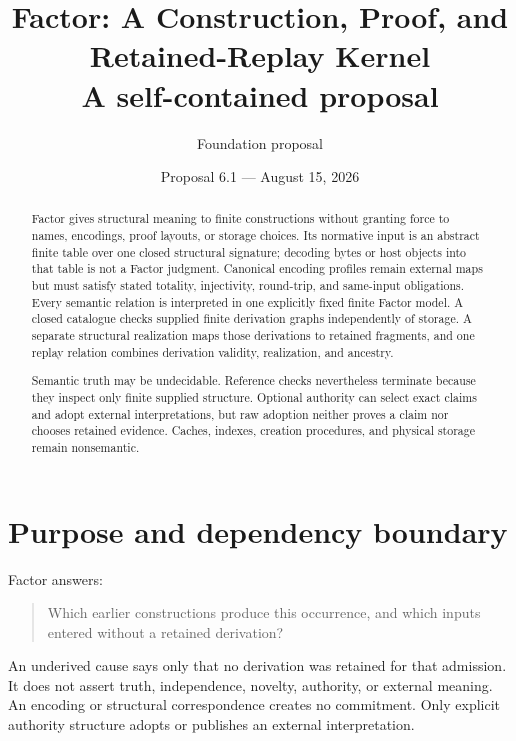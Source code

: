 \documentclass[11pt,twoside]{article}
\title{\textbf{Factor: A Construction, Proof, and Retained-Replay Kernel}\\[0.35em]
\large A self-contained proposal}
\author{Foundation proposal}
\date{Proposal 6.1 --- August 15, 2026}
\begin{document}
\maketitle
\thispagestyle{empty}

\begin{abstract}
Factor gives structural meaning to finite constructions without granting force to
names, encodings, proof layouts, or storage choices.  Its normative input is an
abstract finite table over one closed structural signature; decoding bytes or host
objects into that table is not a Factor judgment.  Canonical encoding profiles
remain external maps but must satisfy stated totality, injectivity, round-trip, and
same-input obligations.  Every semantic relation is interpreted in one explicitly
fixed finite Factor model.  A closed catalogue
checks supplied finite derivation graphs independently of storage.  A separate
structural realization maps those derivations to retained fragments, and one replay
relation combines derivation validity, realization, and ancestry.

Semantic truth may be undecidable.  Reference checks nevertheless terminate
because they inspect only finite supplied structure.  Optional authority can select
exact claims and adopt external interpretations, but raw adoption neither proves a
claim nor chooses retained evidence.  Caches, indexes, creation procedures, and
physical storage remain nonsemantic.
\end{abstract}

\setcounter{tocdepth}{2}
\newpage
\tableofcontents
\newpage

\section*{Purpose and dependency boundary}

Factor answers:

\begin{quote}
Which earlier constructions produce this occurrence, and which inputs entered
without a retained derivation?
\end{quote}

An underived cause says only that no derivation was retained for that admission.
It does not assert truth, independence, novelty, authority, or external meaning.
An encoding or structural correspondence creates no commitment.  Only explicit
authority structure adopts or publishes an external interpretation.
\end{document}
